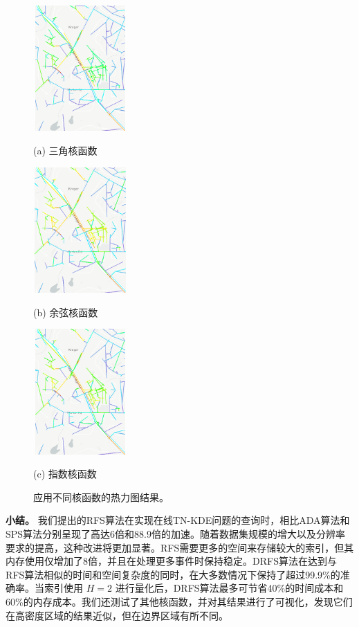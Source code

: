 \begin{figure}[h]
	\begin{minipage}{0.3\linewidth}
	\centering\includegraphics[height=48mm, width=36mm]{./figures/EXP_kernel_Triangular.PNG}
	\caption*{(a) 三角核函数}
	\end{minipage}
	\begin{minipage}{0.3\linewidth}
	\centering\includegraphics[height=48mm, width=36mm]{./figures/EXP_kernel_Cosine.PNG}
	\caption*{(b) 余弦核函数}
	\end{minipage}
	\begin{minipage}{0.3\linewidth}
	\centering\includegraphics[height=48mm, width=36mm]{./figures/EXP_kernel_Exponential.PNG}
	\caption*{(c) 指数核函数}
	\end{minipage}
	\vspace{8pt}
	\caption{应用不同核函数的热力图结果。}
	\label{fig:exp_kernel}
\end{figure}


\noindent\textbf{小结。} 我们提出的RFS算法在实现在线TN-KDE问题的查询时，相比ADA算法和SPS算法分别呈现了高达6倍和88.9倍的加速。随着数据集规模的增大以及分辨率要求的提高，这种改进将更加显著。RFS需要更多的空间来存储较大的索引，但其内存使用仅增加了8倍，并且在处理更多事件时保持稳定。DRFS算法在达到与RFS算法相似的时间和空间复杂度的同时，在大多数情况下保持了超过99.9\%的准确率。当索引使用 $H=2$ 进行量化后，DRFS算法最多可节省40\%的时间成本和60\%的内存成本。我们还测试了其他核函数，并对其结果进行了可视化，发现它们在高密度区域的结果近似，但在边界区域有所不同。
